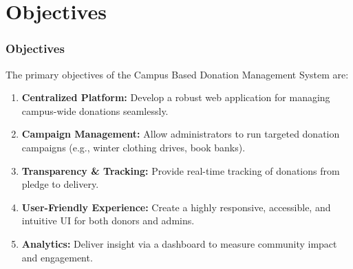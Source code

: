 \documentclass[10pt, compress, aspectratio=169]{beamer}
\begin{document}
\section{Objectives}
\begin{frame}
    \frametitle{Objectives}
    The primary objectives of the Campus Based Donation Management System are:
    \vspace{0.3cm}
    \begin{enumerate}
        \item \textbf{Centralized Platform:} Develop a robust web application for managing campus-wide donations seamlessly.
        \item \textbf{Campaign Management:} Allow administrators to run targeted donation campaigns (e.g., winter clothing drives, book banks).
        \item \textbf{Transparency \& Tracking:} Provide real-time tracking of donations from pledge to delivery.
        \item \textbf{User-Friendly Experience:} Create a highly responsive, accessible, and intuitive UI for both donors and admins.
        \item \textbf{Analytics:} Deliver insight via a dashboard to measure community impact and engagement.
    \end{enumerate}
\end{frame}

\end{document}

